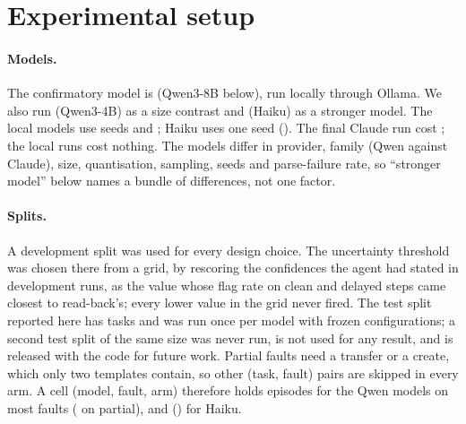 \section{Experimental setup}\label{sec:setup}
\paragraph{Models.} The confirmatory model is \RQwenEightModel{} (Qwen3-8B below), run locally through
Ollama. We also run \RQwenFourModel{} (Qwen3-4B) as a size contrast and \RHaikuModel{} (Haiku) as a
stronger model. The local models use seeds \RQwenEightSeedFirst{} and \RQwenEightSeedSecond{}; Haiku
uses one seed (\RHaikuSeedFirst{}). The final Claude run cost \RHaikuCostUsd{}; the local runs
cost nothing. The models differ in provider, family (Qwen against Claude), size, quantisation, sampling, seeds and
parse-failure rate, so ``stronger model'' below names a bundle of differences, not one factor.

\paragraph{Splits.} A development split was used for every design choice. The uncertainty threshold
was chosen there from a grid, by rescoring the confidences the agent had stated in development runs, as
the value whose flag rate on clean and delayed steps came closest to read-back's; every lower value in
the grid never fired. The test split reported here has \RTasksPerSplit{} tasks and was run once per
model with frozen configurations; a second test split of the same size was never run, is not used for
any result, and is released with the code for future work. Partial faults
need a transfer or a create, which only two templates contain, so other (task, fault) pairs are
skipped in every arm. A cell (model, fault, arm) therefore holds \RQwenEightDropReadbackN{} episodes
for the Qwen models on most faults (\RQwenEightPartialReadbackN{} on partial), and
\RHaikuDropReadbackN{} (\RHaikuPartialReadbackN{}) for Haiku.

